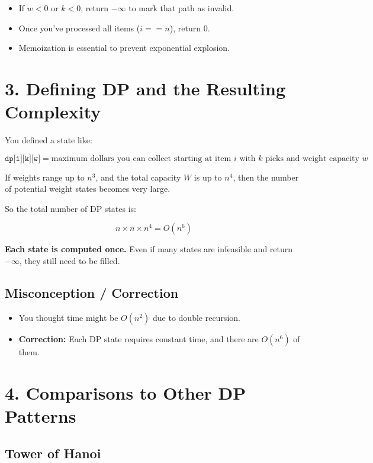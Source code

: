 \documentclass[12pt]{article}
\begin{document}
\begin{itemize}
  \item If $w < 0$ or $k < 0$, return $-\infty$ to mark that path as invalid.
  \item Once you've processed all items ($i == n$), return 0.
  \item Memoization is essential to prevent exponential explosion.
\end{itemize}

\section*{3. Defining DP and the Resulting Complexity}

You defined a state like:

\[
\texttt{dp[i][k][w]} = \text{maximum dollars you can collect starting at item } i \text{ with } k \text{ picks and weight capacity } w
\]

If weights range up to $n^3$, and the total capacity $W$ is up to $n^4$, then the number of potential weight states becomes very large.

So the total number of DP states is:

\[
n \times n \times n^4 = O(n^6)
\]

\textbf{Each state is computed once.} Even if many states are infeasible and return $-\infty$, they still need to be filled.

\subsection*{Misconception / Correction}

\begin{itemize}
  \item You thought time might be $O(n^2)$ due to double recursion.
  \item \textbf{Correction:} Each DP state requires constant time, and there are $O(n^6)$ of them.
\end{itemize}

\section*{4. Comparisons to Other DP Patterns}

\subsection*{Tower of Hanoi}
\end{document}
